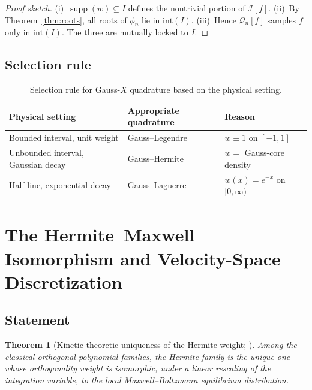 \documentclass[11pt,a4paper]{article}
\newtheorem{theorem}{Theorem}[section]
\theoremstyle{definition}
\newcommand{\I}{\mathcal{I}}
\newcommand{\Q}{\mathcal{Q}}
\DeclareMathOperator{\supp}{supp}
\begin{document}
\begin{proof}[Proof sketch]
(i)~$\supp(w)\subseteq I$ defines the nontrivial portion of $\I[f]$.
(ii)~By Theorem~\ref{thm:roots}, all roots of $\phi_n$ lie in $\mathrm{int}(I)$.
(iii)~Hence $\Q_n[f]$ samples $f$ only in $\mathrm{int}(I)$. The three are
mutually locked to $I$.
\end{proof}

\subsection{Selection rule}

\begin{table}[ht]
\centering
\caption{Selection rule for Gauss-$X$ quadrature based on the physical setting.}
\label{tab:selection}
\begin{tabular}{lll}
\toprule
Physical setting                         & Appropriate quadrature & Reason \\
\midrule
Bounded interval, unit weight            & Gauss--Legendre        & $w\equiv1$ on $[-1,1]$ \\
Unbounded interval, Gaussian decay       & Gauss--Hermite         & $w=$ Gauss-core density \\
Half-line, exponential decay             & Gauss--Laguerre        & $w(x)=e^{-x}$ on $[0,\infty)$ \\
\bottomrule
\end{tabular}
\end{table}

\section{The Hermite--Maxwell Isomorphism and Velocity-Space Discretization}
\label{sec:HM}

\subsection{Statement}

\begin{theorem}[Kinetic-theoretic uniqueness of the Hermite weight;
\cite{ShanHe1998,ShanYuanChen2006}]\label{thm:hermite-maxwell}
Among the classical orthogonal polynomial families, the Hermite family is the
\emph{unique} one whose orthogonality weight is isomorphic, under a linear
rescaling of the integration variable, to the local Maxwell--Boltzmann
equilibrium distribution.
\end{theorem}
\end{document}
